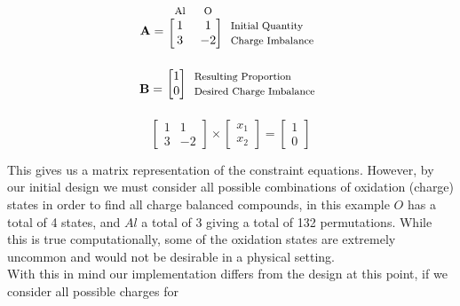\begin{minipage}{0.4\textwidth}
\vspace{-1em}
\begin{equation*}
	\mathbf{A}=
	\begin{blockarray}{*{2}{c} l}
		\begin{block}{*{2}{>{$\footnotesize}c<{$}} l}
			Al & O  \\
		\end{block}
		\begin{block}{[*{2}{c}]>{$\footnotesize}l<{$}}
			1 & 1 & Initial Quantity \\
			3 & -2 & Charge Imbalance \\
		\end{block}
	\end{blockarray}
\end{equation*}
\begin{equation*}
	\mathbf{B}=
		\begin{blockarray}{*{1}{c} l}
		\begin{block}{[*{1}{c}]>{$\footnotesize}l<{$}}
			1 &  Resulting Proportion \\
			0 &  Desired Charge Imbalance \\
		\end{block}
	\end{blockarray}
\end{equation*}
\begin{equation*}
	\begin{bmatrix}
	1 & 1 \\
	3 & -2
	\end{bmatrix}
	\times
	\begin{bmatrix}
	x_1 \\
	x_2
	\end{bmatrix}
	=
	\begin{bmatrix}
	1 \\
	0 
	\end{bmatrix}
\end{equation*}
\end{minipage}
\hfill
\begin{minipage}{0.6\textwidth}
	\vspace{1.5em}
	This gives us a matrix representation of the constraint equations. However, by our initial design we must consider all possible combinations of oxidation (charge) states in order to find all charge balanced compounds, in this example $O$ has a total of 4 states, and $Al$ a total of 3 giving a total of 132 permutations. While this is true computationally, some of the oxidation states are extremely uncommon and would not be desirable in a physical setting. \\
	
	\vspace{1.5em}
	With this in mind our implementation differs from the design at this point, if we consider all possible charges for\\
\end{minipage}
\vspace{-1.3em}

